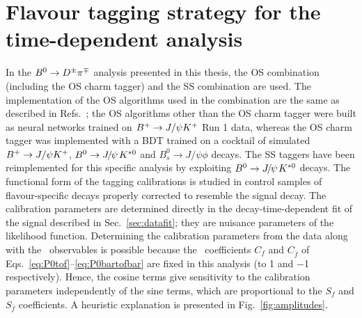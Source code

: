 \section[Flavour tagging strategy for the $\Bz\to\Dmp\pipm$ time-dependent analysis]{Flavour tagging strategy for the \boldmath{$\Bz\to\Dmp\pipm$} time-dependent analysis}
\label{sec:tagging:strategy}
In the $B^0\rightarrow D^\pm\pi^\mp$ analysis presented in this thesis, the OS combination (including the OS charm tagger) and the SS
combination are used. The implementation of the OS algorithms used in the combination are the same as described
in Refs.~\cite{LHCb-PAPER-2011-027,LHCb-PAPER-2015-027}; the OS algorithms other than the OS charm tagger were built as neural networks
trained on $B^+\rightarrow J/\psi K^+$ Run 1 data, whereas the OS charm tagger was implemented with a BDT trained on a cocktail of simulated
$B^+\rightarrow J/\psi K^+$, $\Bz\to\jpsi\Kstarz$ and $B^0_s\to J/\psi\phi$ decays.
The SS taggers have been reimplemented for this specific analysis by exploiting $\Bz\to\jpsi\Kstarz$ decays.
The functional form of the tagging calibrations is studied in control samples of
flavour-specific decays properly corrected to resemble the signal decay.
The calibration parameters are determined directly in the decay-time-dependent
fit of the signal described in Sec.~\ref{sec:datafit};
they are nuisance parameters of the likelihood function.
Determining the calibration parameters from the data along with
the \CP~observables is possible because the \CP~coefficients $C_f$ and $C_{\bar f}$ of Eqs.~\ref{eq:P0tof}--\ref{eq:P0bartofbar} are fixed in this analysis
(to \num{+1} and \num{-1} respectively). Hence, the cosine terms give sensitivity to the calibration parameters
independently of the sine terms, which are proportional to the $S_f$ and $S_{\bar{f}}$ coefficients. A heuristic explanation is presented in
Fig.~\ref{fig:amplitudes}.
